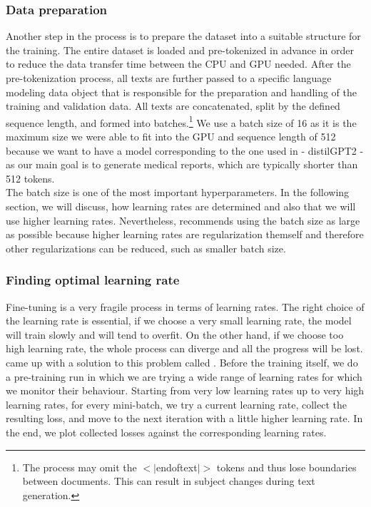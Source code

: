 \subsubsection*{Data preparation}
Another step in the process is to prepare the dataset into a suitable structure for the training. The entire dataset is loaded and pre-tokenized in advance in order to reduce the data transfer time between the CPU and GPU needed. After the pre-tokenization process, all texts are further passed to a specific language modeling data object that is responsible for the preparation and handling of the training and validation data. All texts are concatenated, split by the defined sequence length, and formed into batches.\footnote[9]{The process may omit the $<|$endoftext$|>$ tokens and thus lose boundaries between documents. This can result in subject changes during text generation.} We use a batch size of 16 as it is the maximum size we were able to fit into the GPU and sequence length of 512 because we want to have a model corresponding to the one used in \citet{alfarghaly2021automated} - distilGPT2 - as our main goal is to generate medical reports, which are typically shorter than 512 tokens.\\

The batch size is one of the most important hyperparameters. In the following section, we will discuss, how learning rates are determined and also that we will use higher learning rates. Nevertheless, \citet{smith2018disciplined} recommends using the batch size as large as possible because higher learning rates are regularization themself and therefore other regularizations can be reduced, such as smaller batch size.

\subsubsection*{Finding optimal learning rate}
Fine-tuning is a very fragile process in terms of learning rates. The right choice of the learning rate is essential, if we choose a very small learning rate, the model will train slowly and will tend to overfit. On the other hand, if we choose too high learning rate, the whole process can diverge and all the progress will be lost.\\

\citet{smith2017cyclical} came up with a solution to this problem called . Before the training itself, we do a pre-training run in which we are trying a wide range of learning rates for which we monitor their behaviour. Starting from very low learning rates up to very high learning rates, for every mini-batch, we try a current learning rate, collect the resulting loss, and move to the next iteration with a little higher learning rate. In the end, we plot collected losses against the corresponding learning rates.\\

